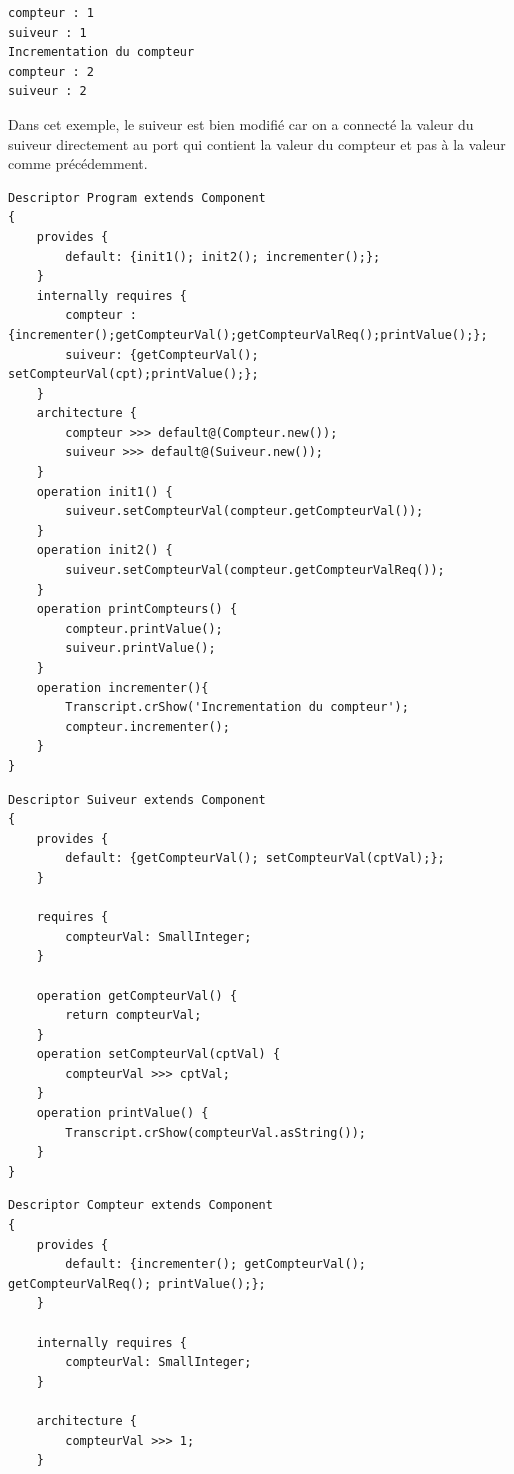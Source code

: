 \documentclass[11pt,a4paper,openany,oneside]{book}
\begin{document}
\begin{appendices}
\begin{lstlisting}[language=Compo, frame=single, caption=Output (Retour par requis)]
compteur : 1
suiveur : 1
Incrementation du compteur
compteur : 2
suiveur : 2
\end{lstlisting}

Dans cet exemple, le suiveur est bien modifié car on a connecté la valeur du suiveur directement au port qui contient la valeur du compteur et pas à la valeur comme précédemment.


\clearpage

\begin{lstlisting}[language=Compo, frame=single, caption=Le programme]
Descriptor Program extends Component
{
	provides {
		default: {init1(); init2(); incrementer();};
	}
	internally requires {
		compteur : {incrementer();getCompteurVal();getCompteurValReq();printValue();};
		suiveur: {getCompteurVal(); setCompteurVal(cpt);printValue();};
	}
	architecture {
	    compteur >>> default@(Compteur.new());
	    suiveur >>> default@(Suiveur.new());
	}
	operation init1() {
    	suiveur.setCompteurVal(compteur.getCompteurVal());
	}
	operation init2() {
        suiveur.setCompteurVal(compteur.getCompteurValReq());
	}
	operation printCompteurs() {
        compteur.printValue();
        suiveur.printValue();
	}
	operation incrementer(){
        Transcript.crShow('Incrementation du compteur');
        compteur.incrementer();
	}
}
\end{lstlisting}

\begin{lstlisting}[language=Compo, frame=single, caption=Programme Suiveur]
Descriptor Suiveur extends Component
{
	provides {
		default: {getCompteurVal(); setCompteurVal(cptVal);};
	}
	
	requires {
		compteurVal: SmallInteger;
	}
	
	operation getCompteurVal() {
		return compteurVal;
	}
	operation setCompteurVal(cptVal) {
		compteurVal >>> cptVal;
	}
	operation printValue() {
	    Transcript.crShow(compteurVal.asString());
	}
}
\end{lstlisting}

\begin{lstlisting}[language=Compo, frame=single, caption=Programme Compteur]
Descriptor Compteur extends Component
{
	provides {
		default: {incrementer(); getCompteurVal(); getCompteurValReq(); printValue();};
	}
	
	internally requires {
		compteurVal: SmallInteger;
	}
	
	architecture {
	    compteurVal >>> 1;
	}
	

\end{lstlisting}
\end{appendices}
\end{document}
